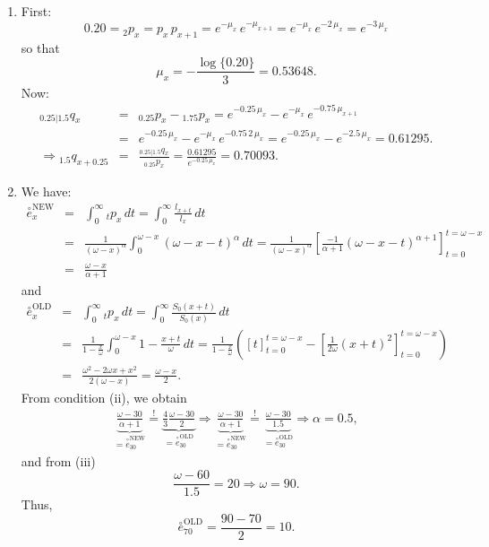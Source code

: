 \documentclass[11pt,fleqn,oneside]{book}
\begin{document}
\footnotesize
\begin{enumerate}
\item First:
$$
0.20 = {_2p_x} = p_x\,p_{x+1} = e^{-\mu_x}\,e^{-\mu_{x+1}} = e^{-\mu_x}\,e^{-2\,\mu_x} = e^{-3\,\mu_x} 
$$
so that
$$
\mu_x = - \frac{\log\{0.20\}}{3} = 0.53648.
$$
Now:
\begin{eqnarray*}
{_{0.25|1.5}q_x} &=& {_{0.25}p_x} - {_{1.75}p_x} = e^{-0.25\,\mu_x} - e^{-\mu_x}\,e^{-0.75\,\mu_{x+1}} \\
&=& e^{-0.25\,\mu_x} - e^{-\mu_x}\,e^{-0.75\,2\,\mu_x} =  e^{-0.25\,\mu_x} - e^{-2.5\,\mu_x} = 0.61295.\\
\Rightarrow {_{1.5}q_{x+0.25}} &=& \frac{{_{0.25|1.5}q_x}}{_{0.25}p_x} = \frac{0.61295}{e^{-0.25\,\mu_x}}= 0.70093.
\end{eqnarray*}
\item We have:
\begin{eqnarray*}
\stackrel{\circ}{e}^{\text{NEW}}_x &=& \int_0^{\infty} {_tp_x}\,dt 
= \int_0^{\infty} \frac{l_{x+t}}{l_x} \,dt\\
&=& \frac{1}{(\omega - x)^{\alpha}} \int_0^{\omega - x} (\omega - x - t)^{\alpha}\,dt
= \frac{1}{(\omega - x)^{\alpha}} \left[\frac{-1}{\alpha + 1} (\omega - x - t)^{\alpha+1}\right]_{t=0}^{t=\omega - x}\\
&=& \frac{\omega - x}{\alpha + 1}
\end{eqnarray*}
and 
\begin{eqnarray*}
\stackrel{\circ}{e}^{\text{OLD}}_x  &=& \int_0^{\infty} {_tp_x}\,dt 
= \int_0^{\infty} \frac{S_0(x+t)}{S_0(x)} \,dt\\ 
&=& \frac{1}{1 - \frac{x}{\omega}} \int_0^{\omega - x} 1 - \frac{x+t}{\omega}\,dt
= \frac{1}{1 - \frac{x}{\omega}} \left(\left[t\right]_{t=0}^{t=\omega - x} - \left[\frac{1}{2\omega}(x+t)^2\right]_{t=0}^{t=\omega - x}\right)\\
&=& \frac{\omega^2 - 2\omega x + x^2}{2(\omega - x)}
= \frac{\omega - x}{2}.
\end{eqnarray*}
From condition (ii), we obtain
\begin{eqnarray*}
\underbrace{\frac{\omega - 30}{\alpha + 1}}_{=\stackrel{\circ}{e}^{\text{NEW}}_{30}} \stackrel{!}{=} \underbrace{\frac{4}{3} \frac{\omega - 30}{2}}_{=\stackrel{\circ}{e}^{\text{OLD}}_{30}}
\Rightarrow \underbrace{\frac{\omega - 30}{\alpha + 1}}_{=\stackrel{\circ}{e}^{\text{NEW}}_{30}} \stackrel{!}{=} \underbrace{\frac{\omega - 30}{1.5}}_{=\stackrel{\circ}{e}^{\text{OLD}}_{30}}
\Rightarrow \alpha = 0.5,
\end{eqnarray*}
and from (iii)
$$
\frac{\omega - 60}{1.5} = 20 \Rightarrow \omega = 90.
$$
Thus,
$$
\stackrel{\circ}{e}^{\text{OLD}}_{70} = \frac{90-70}{2} = 10.
$$
\end{enumerate}
\normalsize
\end{document}
